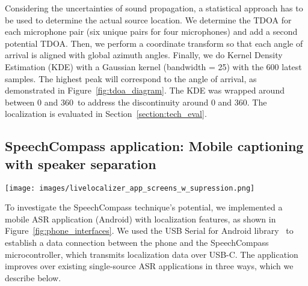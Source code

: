 Considering the uncertainties of sound propagation, a statistical approach has to be used to determine the actual source location. We determine the TDOA for each microphone pair (six unique pairs for four microphones) and add a second potential TDOA. Then, we perform a coordinate transform so that each angle of arrival is aligned with global azimuth angles. Finally, we do Kernel Density Estimation (KDE) with a Gaussian kernel (bandwidth = 25) with the 600 latest samples. The highest peak will correspond to the angle of arrival, as demonstrated in Figure~\ref{fig:tdoa_diagram}. The KDE was wrapped around between 0 and 360\textdegree~to address the discontinuity around 0 and 360\textdegree. The localization is evaluated in Section~\ref{section:tech_eval}. 

\subsection{SpeechCompass application: Mobile captioning with speaker separation} \label{subsection:app}

\begin{figure*}
  \centering
  \texttt{[image: images/livelocalizer\_app\_screens\_w\_supression.png]}
  \caption{The mobile phone application with different direction visualization options. A) Directional glyphs are arrows next to the transcript, indicating the direction of speech. B) Minimap and directional glyph as radius inside the circle. C) Directional cues embedded in the color of the text and boxes around the text. D) Enabling speech suppression for right and bottom speech directions, as shown on the minimap. }
  \label{fig:phone_interfaces}  
\end{figure*}

To investigate the SpeechCompass technique's potential, we implemented a mobile ASR application (Android) with localization features, as shown in Figure~\ref{fig:phone_interfaces}. We used the USB Serial for Android library~\cite{AndroidUSBLibrary} to establish a data connection between the phone and the SpeechCompass microcontroller, which transmits localization data over USB-C. The application improves over existing single-source ASR applications in three ways, which we describe below.

